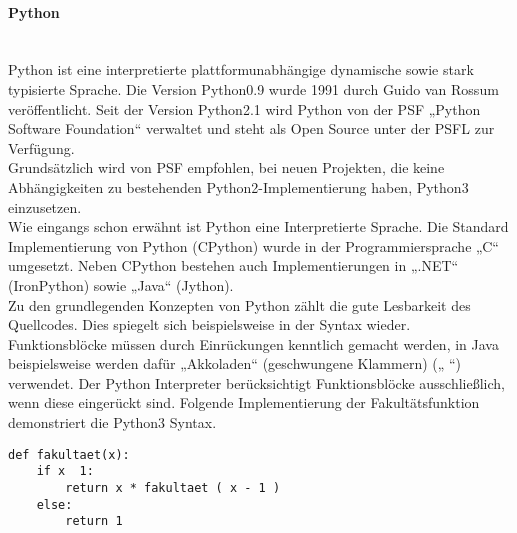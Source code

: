\documentclass[../Bachelorarbeit.tex]{subfiles}
\begin{document}
\paragraph{Python}\mbox{}\\
\label{para:python}
Python ist eine interpretierte plattformunabhängige dynamische sowie stark typisierte 
Sprache. Die Version Python0.9 wurde 1991 durch Guido van Rossum veröffentlicht. Seit 
der Version Python2.1 wird Python von der \ac{PSF} „Python Software Foundation“ verwaltet und 
steht als Open Source unter der \ac{PSFL} zur Verfügung.
\parencites[vgl.][]{python_typed_lang}[][]{python_history}[][]{python_faq}\\
Grundsätzlich wird von \ac{PSF} empfohlen, bei neuen Projekten, die keine 
Abhängigkeiten zu bestehenden Python2-Implementierung haben, Python3 einzusetzen. 
\parencite[vgl.][]{python2_or_python3} \\
Wie eingangs schon erwähnt ist Python eine Interpretierte Sprache. Die Standard Implementierung von Python (CPython) wurde in der Programmiersprache „C“ umgesetzt. 
Neben CPython bestehen auch Implementierungen in „.NET“ (IronPython) sowie „Java“ 
(Jython).
\parencite[vgl.][]{about_python} \\
Zu den grundlegenden Konzepten von Python zählt die gute Lesbarkeit des Quellcodes. 
Dies spiegelt sich beispielsweise in der Syntax wieder. Funktionsblöcke müssen durch 
Einrückungen kenntlich gemacht werden, in Java beispielsweise werden dafür 
„Akkoladen“ (geschwungene Klammern) („{ }“) verwendet. Der Python Interpreter 
berücksichtigt Funktionsblöcke ausschließlich, wenn diese eingerückt sind. Folgende 
Implementierung der
Fakultätsfunktion demonstriert die Python3 Syntax. \\

\lstset{language=Python}
\begin{lstlisting}
def fakultaet(x):
	if x  1:
		return x * fakultaet ( x - 1 )
	else:
		return 1
\end{lstlisting}
\end{document}
